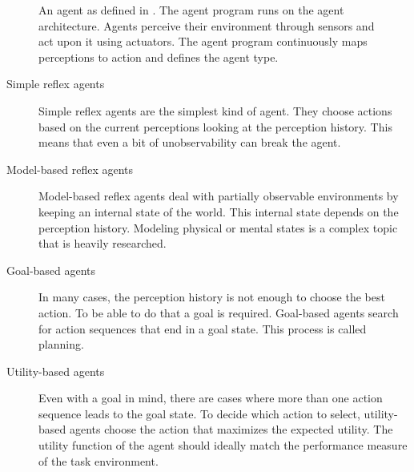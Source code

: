 \documentclass[../main.tex]{subfiles}
\begin{document}
\begin{figure}[t]
    \centering
    \caption{An agent as defined in \autocite{Russel2022}.
        The agent program runs on the agent architecture.
        Agents perceive their environment through sensors and act upon it using actuators.
        The agent program continuously maps perceptions to action and defines the agent type.}
    \label{fig:agent_overview}
\end{figure}

\begin{description}
    \item[Simple reflex agents]
          Simple reflex agents are the simplest kind of agent.
          They choose actions based on the current perceptions looking at the perception history.
          This means that even a bit of unobservability can break the agent.
    \item[Model-based reflex agents]
          Model-based reflex agents deal with partially observable environments
          by keeping an internal state of the world.
          This internal state depends on the perception history.
          Modeling physical or mental states is a complex topic that is heavily researched.
    \item[Goal-based agents]
          In many cases, the perception history is not enough to choose the best action.
          To be able to do that a goal is required.
          Goal-based agents search for action sequences that end in a goal state.
          This process is called planning.
    \item[Utility-based agents]
          Even with a goal in mind, there are cases where more than one action sequence leads to the goal state.
          To decide which action to select, utility-based agents choose the action that maximizes the expected utility.
          The utility function of the agent should ideally match the performance measure of the task environment.
\end{description}
\end{document}
